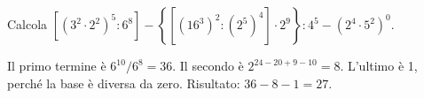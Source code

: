 
\begin{esercizio}
Calcola $\left[(3^2\cdot2^2)^5:6^8\right]-\left\{\left[(16^3)^2:(2^5)^4\right]\cdot2^9\right\}:4^5-(2^4\cdot5^2)^0$.
\end{esercizio}

\begin{soluzione}
Il primo termine è $6^{10}/6^8=36$. Il secondo è $2^{24-20+9-10}=8$. L'ultimo è 1, perché la base è diversa da zero. Risultato: $36-8-1=27$.
\end{soluzione}
